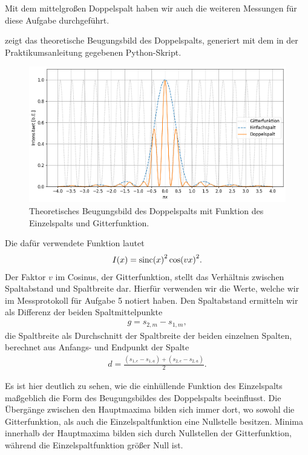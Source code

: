 Mit dem mittelgroßen Doppelspalt haben wir auch die weiteren Messungen für diese Aufgabe durchgeführt.

 zeigt das theoretische Beugungsbild des Doppelspalts, generiert mit dem in der Praktikumsanleitung gegebenen Python-Skript. 

\begin{figure}[H]
  \centering
  \includegraphics[width=.9\textwidth]{files/plots/3/ds_theorie_beugungsbild.png}
  \caption{Theoretisches Beugungsbild des Doppelspalts mit Funktion des Einzelspalts und Gitterfunktion.}
  \label{fig:ds_theorie_beugungsbild}
\end{figure}

Die dafür verwendete Funktion lautet
\begin{align}
  I(x) = \mathrm{sinc}\qty(x)^2 \cos(vx)^2.
\end{align}
Der Faktor $v$ im Cosinus, der Gitterfunktion, stellt das Verhältnis zwischen Spaltabstand und Spaltbreite dar. Hierfür verwenden wir die Werte, welche wir im Messprotokoll für Aufgabe 5 notiert haben. Den Spaltabstand ermitteln wir als Differenz der beiden Spaltmittelpunkte
\begin{align}
  g = s_{2,m} - s_{1,m},
\end{align}
die Spaltbreite als Durchschnitt der Spaltbreite der beiden einzelnen Spalten, berechnet aus Anfangs- und Endpunkt der Spalte
\begin{align}
  d = \frac{(s_{1,e} - s_{1,a}) + (s_{2,e} - s_{2,a})}{2}.
\end{align}

Es ist hier deutlich zu sehen, wie die einhüllende Funktion des Einzelspalts maßgeblich die Form des Beugungsbildes des Doppelspalts beeinflusst. Die Übergänge zwischen den Hauptmaxima bilden sich immer dort, wo sowohl die Gitterfunktion, als auch die Einzelspaltfunktion eine Nullstelle besitzen. Minima innerhalb der Hauptmaxima bilden sich durch Nullstellen der Gitterfunktion, während die Einzelspaltfunktion größer Null ist.

